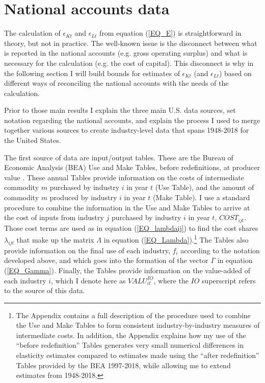 \documentclass[11pt]{article}
\begin{document}
\section{National accounts data}\label{SEC_accounts}
The calculation of $\epsilon_{Kt}$ and $\epsilon_{Lt}$ from equation (\ref{EQ_E}) is straightforward in theory, but not in practice. The well-known issue is the disconnect between what is reported in the national accounts (e.g. gross operating surplus) and what is necessary for the calculation (e.g. the cost of capital). This disconnect is why in the following section I will build bounds for estimates of $\epsilon_{Kt}$ (and $\epsilon_{Lt}$) based on different ways of reconciling the national accounts with the needs of the calculation. 

Prior to those main results I explain the three main U.S. data sources, set notation regarding the national accounts, and explain the process I used to merge together various sources to create industry-level data that spans 1948-2018 for the United States.

The first source of data are input/output tables. These are the Bureau of Economic Analysis (BEA) Use and Make Tables, before redefinitions, at producer value \citep{beaio}. These annual Tables provide information on the costs of intermediate commodity $m$ purchased by industry $i$ in year $t$ (Use Table), and the amount of commodity $m$ produced by industry $i$ in year $t$ (Make Table). I use a standard procedure to combine the information in the Use and Make Tables to arrive at the cost of inputs from industry $j$ purchased by industry $i$ in year $t$, $COST_{ijt}$. Those cost terms are used as in equation (\ref{EQ_lambdaij}) to find the cost shares $\lambda_{ijt}$ that make up the matrix $\Lambda$ in equation (\ref{EQ_Lambda}).\footnote{The Appendix contains a full description of the procedure used to combine the Use and Make Tables to form consistent industry-by-industry measures of intermediate costs. In addition, the Appendix explains how my use of the ``before redefinition'' Tables generates very small numerical differences in elasticity estimates compared to estimates made using the ``after redefinition'' Tables provided by the BEA 1997-2018, while allowing me to extend estimates from 1948-2018.} The Tables also provide information on the final use of each industry, $f_i$ according to the notation developed above, and which goes into the formation of the vector $\Gamma$ in equation (\ref{EQ_Gamma}). Finally, the Tables provide information on the value-added of each industry $i$, which I denote here as $VALU_{it}^{IO}$, where the $IO$ superscript refers to the source of this data.
\end{document}
